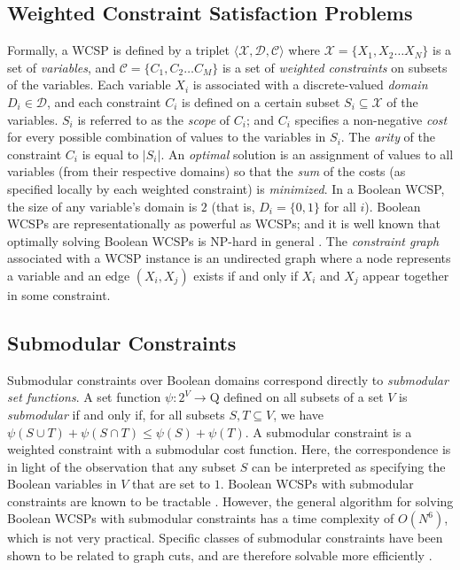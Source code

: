 \subsection{Weighted Constraint Satisfaction Problems}
  Formally, a WCSP is defined by a triplet $\langle \mathcal{X,D,C} \rangle$ where $\mathcal{X} = \{ X_1,X_2 \ldots X_N \}$ is a set of \emph{variables}, and $\mathcal{C} = \{ C_1,C_2 \ldots C_M \}$ is a set of \emph{weighted constraints} on subsets of the variables. Each variable $X_i$ is associated with a discrete-valued \emph{domain} $D_i \in \mathcal{D}$, and each constraint $C_i$ is defined on a certain subset $S_i \subseteq \mathcal{X}$ of the variables. $S_i$ is referred to as the \emph{scope} of $C_i$; and $C_i$ specifies a non-negative \emph{cost} for every possible combination of values to the variables in $S_i$. The \emph{arity} of the constraint $C_i$ is equal to $|S_i|$. An \emph{optimal} solution is an assignment of values to all variables (from their respective domains) so that the \emph{sum} of the costs (as specified locally by each weighted constraint) is \emph{minimized}. In a Boolean WCSP, the size of any variable's domain is $2$ (that is, $D_i = \{ 0,1 \}$ for all $i$). Boolean WCSPs are representationally as powerful as WCSPs; and it is well known that optimally solving Boolean WCSPs is NP-hard in general \cite{D:BOOK:03}. The \emph{constraint graph} associated with a WCSP instance is an undirected graph where a node represents a variable and an edge $(X_i,X_j)$ exists if and only if $X_i$ and $X_j$ appear together in some constraint.


\subsection{Submodular Constraints}
  Submodular constraints over Boolean domains correspond directly to \emph{submodular set functions}. A set function $\psi : 2^V \rightarrow \mathrm{Q}$ defined on all subsets of a set $V$ is \emph{submodular} if and only if, for all subsets $S, T \subseteq V$, we have $\psi(S \cup T) + \psi(S \cap T) \leq \psi(S) + \psi(T)$. A submodular constraint is a weighted constraint with a submodular cost function. Here, the correspondence is in light of the observation that any subset $S$ can be interpreted as specifying the Boolean variables in $V$ that are set to $1$. Boolean WCSPs with submodular constraints are known to be tractable \cite{ZSH:CSC:10}. However, the general algorithm for solving Boolean WCSPs with submodular constraints has a time complexity of $O(N^6)$, which is not very practical. Specific classes of submodular constraints have been shown to be related to graph cuts, and are therefore solvable more efficiently \cite{ZSH:CSC:10}.

